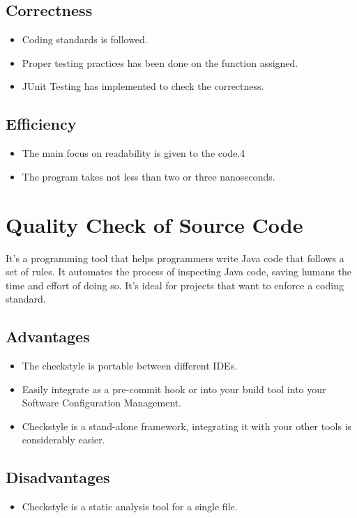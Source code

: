 \documentclass[a4paper,12pt]{article}
\begin{document}
    \subsection{Correctness}
        \begin{itemize}
            \item Coding standards is followed.
            \item Proper testing practices has been done on the function assigned. 
            \item JUnit Testing has implemented to check the correctness. 
        \end{itemize}
    
   
    \subsection{Efficiency}
    \begin{itemize}
        \item The main focus on readability is given to the code.4
        \item The program takes not less than two or three nanoseconds.
    \end{itemize}
    
    \section{Quality Check of Source Code}
    It's a programming tool that helps programmers write Java code that follows a set of rules. It automates the process of inspecting Java code, saving humans the time and effort of doing so. It's ideal for projects that want to enforce a coding standard.
    \subsection{Advantages}
    \begin{itemize}
        \item The checkstyle is portable between different IDEs.
        \item Easily integrate as a pre-commit hook or into your build tool into your Software Configuration Management.
        \item Checkstyle is a stand-alone framework, integrating it with your other tools is considerably easier.
    \end{itemize}
    \subsection{Disadvantages}
    \begin{itemize}
        \item Checkstyle is a static analysis tool for a single file.
    \end{itemize}
\end{document}
